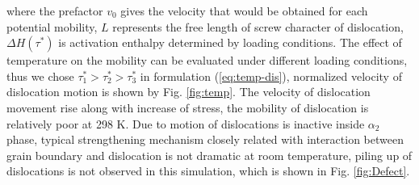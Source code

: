 \documentclass[Unknown,article,submit,moreauthors,pdftex,10pt,a4paper]{Definitions/mdpi}
\begin{document}
where the prefactor $v_0$ gives the velocity that would be obtained for each potential mobility, $L$ represents the free length of screw character of dislocation, $\Delta H(\tau^*)$ is activation enthalpy determined by loading conditions. The effect of temperature on the mobility can be evaluated under different loading conditions, thus we chose  $\tau_1^*>\tau_2^*>\tau_3^*$ in formulation (\ref{eq:temp-dis}), normalized velocity of dislocation motion is shown by Fig. \ref{fig:temp}. The velocity  of dislocation movement rise along with increase of  stress, the mobility  of dislocation is relatively poor at 298 K. Due to motion of dislocations is inactive inside $\alpha_2$ phase,  typical strengthening mechanism closely related with interaction between grain boundary and dislocation is not dramatic at room temperature, piling up of dislocations is not observed in this simulation, which is shown in Fig. \ref{fig:Defect}.
\end{document}
